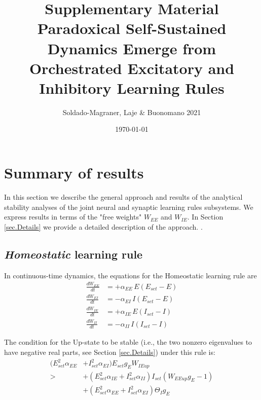 \documentclass[twocolumn]{article}
\newcommand{\EE}{\mathit{EE}}
\newcommand{\EI}{\mathit{EI}}
\newcommand{\IE}{\mathit{IE}}
\newcommand{\II}{\mathit{II}}
\newcommand{\set}{\mathit{set}}
\newcommand{\up}{\mathit{up}}
\begin{document}
\title{\vspace{-2.0cm}Supplementary Material\\{\bf Paradoxical Self-Sustained Dynamics Emerge from Orchestrated Excitatory and Inhibitory Learning Rules}}
\author{Soldado-Magraner, Laje \& Buonomano 2021}
\date{\today}

\maketitle

\tableofcontents

\section{Summary of results}

In this section we describe the general approach and results of the analytical stability analyses of the joint neural and synaptic learning rules subsystems. We express results in terms of the "free weights" $W_{\EE}$ and $W_{\IE}$. In Section \ref{sec.Details} we provide a detailed description of the approach. .


\subsection{{\em Homeostatic} learning rule}

In continuous-time dynamics, the equations for the Homeostatic learning rule are
\begin{equation}
\begin{aligned}
\frac{dW_{\EE}}{dt} & = +\alpha_{\EE} \, E (E_{\set} - E) \\
\frac{dW_{\EI}}{dt} & = -\alpha_{\EI} \, I (E_{\set} - E) \\
\frac{dW_{\IE}}{dt} & = +\alpha_{\IE} \, E (I_{\set} - I) \\
\frac{dW_{\II}}{dt} & = -\alpha_{\II} \, I (I_{\set} - I)
\end{aligned}
\label{eq.SH_summary}
\end{equation}

\noindent The condition for the Up-state to be stable (i.e., the two nonzero eigenvalues to have negative real parts, see Section \ref{sec.Details}) under this rule is:
\begin{equation}
\begin{aligned}
(E_{\set}^2 \alpha_{\EE} & + I_{\set}^2 \alpha_{\EI}) E_{\set} g_E W_{\IE\up} \\
> & + (E_{\set}^2 \alpha_{\IE} + I_{\set}^2 \alpha_{\II}) I_{\set}(W_{\EE\up} g_E - 1) \\
& + (E_{\set}^2 \alpha_{\EE} + I_{\set}^2 \alpha_{\EI}) \Theta_I g_E
\end{aligned}
\label{eq.SH_stable_cond_v1_summary}
\end{equation}
\end{document}
